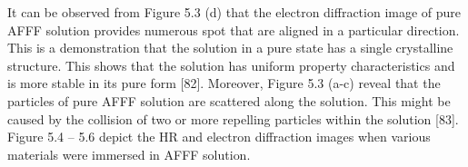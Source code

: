 \documentclass[12pt]{report}
\begin{document}
It can be observed from Figure 5.3 (d) that the electron diffraction image of pure AFFF solution provides numerous spot that are aligned in a particular direction. This is a demonstration that the solution in a pure state has a single crystalline structure. This shows that the solution has uniform property characteristics and is more stable in its pure form [82].  Moreover, Figure 5.3 (a-c) reveal that the particles of pure AFFF solution are scattered along the solution. This might be caused by the collision of two or more repelling particles within the solution [83]. Figure 5.4 – 5.6 depict the HR and electron diffraction images when various materials were immersed in AFFF solution. 
  


\end{document}
